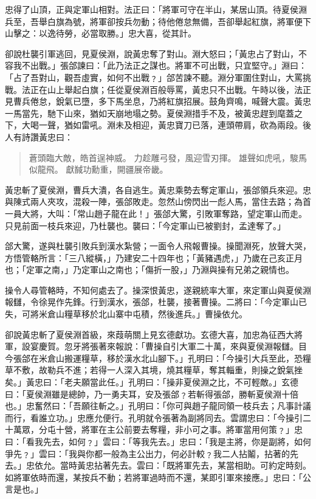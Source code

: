 忠得了山頂，正與定軍山相對。法正曰：「將軍可守在半山，某居山頂。待夏侯淵兵至，吾舉白旗為號，將軍卻按兵勿動；待他倦怠無備，吾卻舉起紅旗，將軍便下山擊之：以逸待勞，必當取勝。」忠大喜，從其計。

卻說杜襲引軍逃回，見夏侯淵，說黃忠奪了對山。淵大怒曰；「黃忠占了對山，不容我不出戰。」張郃諫曰：「此乃法正之謀也。將軍不可出戰，只宜堅守。」淵曰：「占了吾對山，觀吾虛實，如何不出戰﹖」郃苦諫不聽。淵分軍圍住對山，大罵挑戰。法正在山上舉起白旗；任從夏侯淵百般辱罵，黃忠只不出戰。午時以後，法正見曹兵倦怠，銳氣已墮，多下馬坐息，乃將紅旗招展。鼓角齊鳴，喊聲大震。黃忠一馬當先，馳下山來，猶如天崩地塌之勢。夏侯淵措手不及，被黃忠趕到麾蓋之下，大喝一聲，猶如雷吼。淵未及相迎，黃忠寶刀已落，連頭帶肩，砍為兩段。後人有詩讚黃忠曰：

\begin{quote}
蒼頭臨大敵，皓首逞神威。
力趁雕弓發，風迎雪刃揮。
雄聲如虎吼，駿馬似龍飛。
獻馘功勳重，開疆展帝畿。
\end{quote}

黃忠斬了夏侯淵，曹兵大潰，各自逃生。黃忠乘勢去奪定軍山，張郃領兵來迎。忠與陳式兩人夾攻，混殺一陣，張郃敗走。忽然山傍閃出一彪人馬，當住去路；為首一員大將，大叫：「常山趙子龍在此！」張郃大驚，引敗軍奪路，望定軍山而走。只見前面一枝兵來迎，乃杜襲也。襲曰：「今定軍山已被劉封，孟達奪了。」

郃大驚，遂與杜襲引敗兵到漢水紮營；一面令人飛報曹操。操聞淵死，放聲大哭，方悟管輅所言：「三八縱橫，」乃建安二十四年也；「黃豬遇虎，」乃歲在己亥正月也；「定軍之南，」乃定軍山之南也；「傷折一股，」乃淵與操有兄弟之親情也。

操令人尋管輅時，不知何處去了。操深恨黃忠，遂親統率大軍，來定軍山與夏侯淵報讎，令徐晃作先鋒。行到漢水，張郃，杜襲，接著曹操。二將曰：「今定軍山已失，可將米倉山糧草移於北山寨中屯積，然後進兵。」曹操依允。

卻說黃忠斬了夏侯淵首級，來葭萌關上見玄德獻功。玄德大喜，加忠為征西大將軍，設宴慶賀。忽牙將張著來報說：「曹操自引大軍二十萬，來與夏侯淵報讎。目今張郃在米倉山搬運糧草，移於漢水北山腳下。」孔明曰：「今操引大兵至此，恐糧草不敷，故勒兵不進；若得一人深入其境，燒其糧草，奪其輜重，則操之銳氣挫矣。」黃忠曰：「老夫願當此任。」孔明曰：「操非夏侯淵之比，不可輕敵。」玄德曰：「夏侯淵雖是總帥，乃一勇夫耳，安及張郃﹖若斬得張郃，勝斬夏侯淵十倍也。」忠奮然曰：「吾願往斬之。」孔明曰：「你可與趙子龍同領一枝兵去；凡事計議而行，看誰立功。」忠應允便行。孔明就令張著為副將同去。雲謂忠曰：「今操引二十萬眾，分屯十營，將軍在主公前要去奪糧，非小可之事。將軍當用何策﹖」忠曰：「看我先去，如何﹖」雲曰：「等我先去。」忠曰：「我是主將，你是副將，如何爭先﹖」雲曰：「我與你都一般為主公出力，何必計較﹖我二人拈鬮，拈著的先去。」忠依允。當時黃忠拈著先去。雲曰：「既將軍先去，某當相助。可約定時刻。如將軍依時而還，某按兵不動；若將軍過時而不還，某即引軍來接應。」忠曰：「公言是也。」

